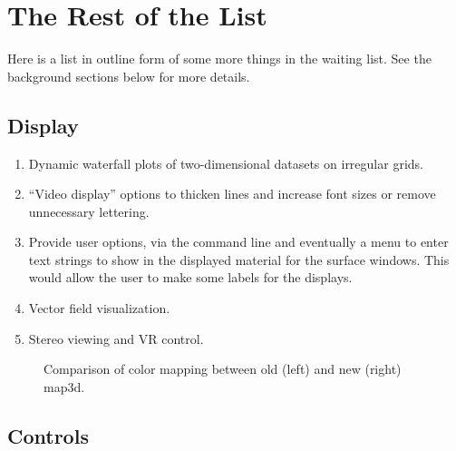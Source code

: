 \documentclass[11pt]{article}
\newcommand{\map}{\emph{map3d}}
\begin{document}
\section{The Rest of the List}

Here is a list in outline form of some more things in the waiting list.
See the background sections below for more details.

\subsection{Display}

\begin{enumerate}
  \item Dynamic waterfall plots of two-dimensional datasets on irregular
        grids. 
  \item ``Video display'' options to thicken lines and increase font
        sizes or remove unnecessary lettering.
  \item Provide user options, via the command line and eventually a menu to
        enter text strings to show in the displayed material for the
        surface windows.  This would allow the user to make some labels for
        the displays.
  \item Vector field visualization.
  \item Stereo viewing and VR control.
\end{enumerate}

\begin{figure}[htb]
  \begin{makeimage}
  \end{makeimage}
\surfcompare
\caption{\label{fig:surfcompare} Comparison of color mapping between old
(left) and new (right) map3d.}
\end{figure}

\subsection{Controls}
\end{document}
